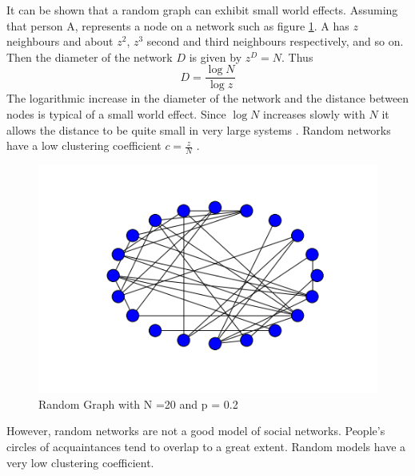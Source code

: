   It can be shown that a random graph can exhibit small world effects. Assuming that person A, represents a node on a network such as figure \ref{fig:3.1}. A has $z$ neighbours and about $z^2$, $z^3$ second and third neighbours respectively, and so on. Then the diameter of the network $D$ is given by $z^D = N$. Thus
   \begin{equation*}
D = \frac{\log N}{\log z} 
\end{equation*}
    The logarithmic increase in the diameter of the network and the distance between nodes is typical of a small world effect. Since $\log N$ increases slowly with $N$ it allows the distance to be quite small in very large systems \citep{newman2000models}.  Random networks have a low clustering coefficient $ c = \frac{z}{N}$ \citep{newman2003structure}.
   \begin{figure}[h!]
   \caption{Random Graph with N =20 and p = 0.2}
   \label{fig:3.1}
   \centering
   \includegraphics[scale=0.5]{images/randomgraph.png} 
   \end{figure}
   
%
%
%
However,  random  networks  are  not  a  good  model  of  social  networks.  People’s  circles  of  
acquaintances  tend  to  overlap  to  a  great  extent. Random models have a very low clustering coefficient.
